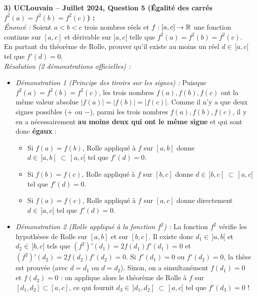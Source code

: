 \begin{exemple}
\medskip
\textbf{3) UCLouvain -- Juillet 2024, Question 5 (Égalité des carrés $f^2(a) = f^2(b) = f^2(c)$) :}\\
\emph{Énoncé :} Soient $a < b < c$ trois nombres réels et $f : [a, c] \to \mathbb{R}$ une fonction continue sur $[a, c]$ et dérivable sur $]a, c[$ telle que $f^2(a) = f^2(b) = f^2(c)$. En partant du théorème de Rolle, prouver qu'il existe au moins un réel $d \in \,]a, c[$ tel que $f'(d) = 0$.\\
\emph{Résolution (2 démonstrations officielles) :}
\begin{itemize}
    \item \emph{Démonstration 1 (Principe des tiroirs sur les signes) :} Puisque $f^2(a) = f^2(b) = f^2(c)$, les trois nombres $f(a), f(b), f(c)$ ont la même valeur absolue $|f(a)| = |f(b)| = |f(c)|$. Comme il n'y a que deux signes possibles ($+$ ou $-$), parmi les trois nombres $f(a), f(b), f(c)$, il y en a nécessairement \textbf{au moins deux qui ont le même signe} et qui sont donc \textbf{égaux} :
    \begin{itemize}
        \item Si $f(a) = f(b)$, Rolle appliqué à $f$ sur $[a, b]$ donne $d \in \,]a, b[ \;\subset \,]a, c[$ tel que $f'(d) = 0$.
        \item Si $f(b) = f(c)$, Rolle appliqué à $f$ sur $[b, c]$ donne $d \in \,]b, c[ \;\subset \,]a, c[$ tel que $f'(d) = 0$.
        \item Si $f(a) = f(c)$, Rolle appliqué à $f$ sur $[a, c]$ donne directement $d \in \,]a, c[$ tel que $f'(d) = 0$.
    \end{itemize}
    \item \emph{Démonstration 2 (Rolle appliqué à la fonction $f^2$) :} La fonction $f^2$ vérifie les hypothèses de Rolle sur $[a, b]$ et sur $[b, c]$. Il existe donc $d_1 \in \,]a, b[$ et $d_2 \in \,]b, c[$ tels que $(f^2)'(d_1) = 2f(d_1)f'(d_1) = 0$ et $(f^2)'(d_2) = 2f(d_2)f'(d_2) = 0$. Si $f'(d_1) = 0$ ou $f'(d_2) = 0$, la thèse est prouvée (avec $d = d_1$ ou $d = d_2$). Sinon, on a simultanément $f(d_1) = 0$ et $f(d_2) = 0$ : on applique alors le théorème de Rolle à $f$ sur $[d_1, d_2] \subset [a, c]$, ce qui fournit $d_3 \in \,]d_1, d_2[ \;\subset \,]a, c[$ tel que $f'(d_3) = 0$ !
\end{itemize}


\end{exemple}
